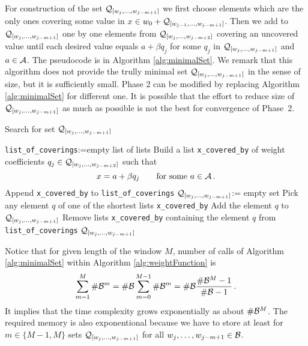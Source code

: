 For construction of the set $\mathcal{Q}_{[w_j,\dots, w_{j-m+1}]}$ we first choose elements which are the only ones covering some value in $x \in w_0 + \mathcal{Q}_{[w_{j-1},\dots, w_{j-m+1}]}$. Then we add to $\mathcal{Q}_{[w_j,\dots, w_{j-m+1}]}$ one by one elements from $\mathcal{Q}_{[w_j,\dots, w_{j-m+2}]}$ covering an uncovered value until each desired value equals $a+\beta q_j$ for some $q_j$ in $\mathcal{Q}_{[w_j,\dots, w_{j-m+1}]}$ and $a\in\mathcal{A}$. The pseudocode is in Algorithm \ref{alg:minimalSet}. We remark that this algorithm does not provide the trully minimal set $\mathcal{Q}_{[w_j,\dots, w_{j-m+1}]}$ in the sense of size, but it is sufficiently small. Phase 2 can be modified by replacing Algorithm \ref{alg:minimalSet} for different one. It is possible that the effort to reduce size of  $\mathcal{Q}_{[w_j,\dots, w_{j-m+1}]}$ as much as possible is not the best for convergence of Phase~2.
\begin{algorithm}
  \caption{Search for set $\mathcal{Q}_{[w_j,\dots, w_{j-m+1}]}$ }
    \label{alg:minimalSet}
  \begin{algorithmic}[1]
    \STATE \verb+list_of_coverings+:=empty list of lists
        \STATE Build a list \verb+x_covered_by+ of weight coefficients $q_j \in \mathcal{Q}_{[w_j,\dots, w_{j-m+2}]}$ such that 
        $$
        x=a+ \beta q_j \qquad\text{for some } a\in\mathcal{A}\,.
        $$ 
        \vspace{-20pt}
        \STATE Append \verb+x_covered_by+ to \verb+list_of_coverings+
    \ENDFOR
    \STATE $\mathcal{Q}_{[w_j,\dots, w_{j-m+1}]}$:= empty set
        \STATE Pick any element $q$ of one of the shortest lists \verb+x_covered_by+
        \STATE Add the element $q$ to $\mathcal{Q}_{[w_j,\dots, w_{j-m+1}]}$
        \STATE Remove lists \verb+x_covered_by+ containing the element $q$ from \verb+list_of_coverings+
    \ENDWHILE
    \RETURN $\mathcal{Q}_{[w_j,\dots, w_{j-m+1}]}$
  \end{algorithmic}
\end{algorithm}

Notice that for given length of the window $M$, number of calls of Algorithm \ref{alg:minimalSet} within Algorithm \ref{alg:weightFunction} is
$$
\sum_{m=1}^M  \#\mathcal{B}^m = \#\mathcal{B} \sum_{m=0}^{M-1}  \#\mathcal{B}^m = \#\mathcal{B} \frac{\#\mathcal{B}^M-1}{\#\mathcal{B}-1}\,.
$$    
It implies that the time complexity grows exponentially as about $\#\mathcal{B}^M$. The required memory is also exponentional because we have to store at least for $m\in\{M-1,M\}$ sets $\mathcal{Q}_{[w_j,\dots, w_{j-m+1}]}$ for all $w_j,\dots, w_{j-m+1} \in \mathcal{B}$.
  
